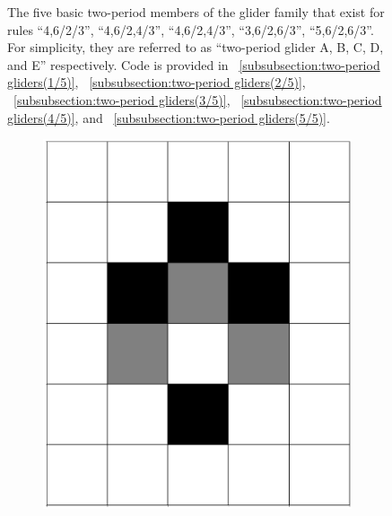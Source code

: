 \documentclass[12pt]{article}
\numberwithin{figure}{section} %
\begin{document}
\begin{figure}[H]
	\caption[Two-period gliders]{The five basic two-period members of the glider family that exist for rules “4,6/2/3”, “4,6/2,4/3”, “4,6/2,4/3”, “3,6/2,6/3”, “5,6/2,6/3”. For simplicity, they are referred to as “two-period glider A, B, C, D, and E” respectively. Code is provided in ~\ref{subsubsection:two-period gliders(1/5)}, ~\ref{subsubsection:two-period gliders(2/5)}, ~\ref{subsubsection:two-period gliders(3/5)}, ~\ref{subsubsection:two-period gliders(4/5)}, and ~\ref{subsubsection:two-period gliders(5/5)}.}
   	\label{fig:two-period gliders}
   	\vspace{-1.5em}
\end{figure}

\begin{figure}[H]
	\begin{subfigure}{0.18\textwidth}
     		\centering
     		\includegraphics[angle=270,width=\linewidth]{Section4/8.0}
    		\subcaption{}
   	\end{subfigure}
     	\begin{subfigure}{0.18\textwidth}
     		\centering

\end{subfigure}
\end{figure}
\end{document}
